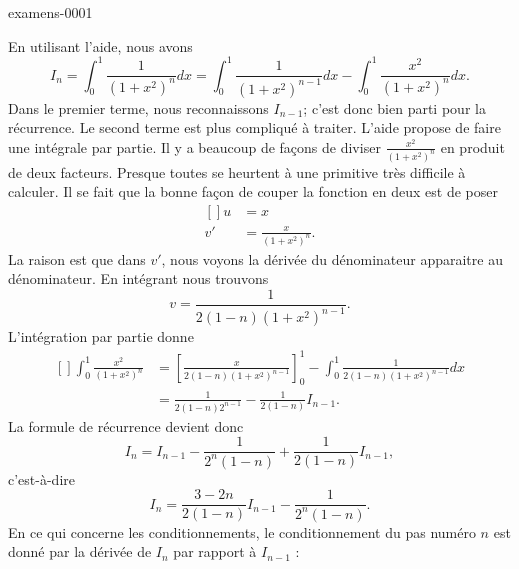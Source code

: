 
\begin{corrige}{examens-0001}

	En utilisant l'aide, nous avons
	\begin{equation}
		I_n=\int_0^1\frac{1}{ (1+x^2)^n }dx=\int_0^1\frac{1}{ (1+x^2)^{n-1} }dx-\int_0^1\frac{ x^2 }{ (1+x^2)^n }dx.
	\end{equation}
	Dans le premier terme, nous reconnaissons $I_{n-1}$; c'est donc bien parti pour la récurrence. Le second terme est plus compliqué à traiter. L'aide propose de faire une intégrale par partie. Il y a beaucoup de façons de diviser $\frac{ x^2 }{ (1+x^2)^n }$ en produit de deux facteurs. Presque toutes se heurtent à une primitive très difficile à calculer. Il se fait que la bonne façon de couper la fonction en deux est de poser
	\begin{equation}
		\begin{aligned}[]
			u&=x\\
			v'&=\frac{ x }{ (1+x^2)^n }.
		\end{aligned}
	\end{equation}
	La raison est que dans $v'$, nous voyons la dérivée du dénominateur apparaitre au dénominateur. En intégrant nous trouvons
	\begin{equation}
		v=\frac{1}{ 2(1-n)(1+x^2)^{n-1} }.
	\end{equation}
	L'intégration par partie donne
	\begin{equation}
		\begin{aligned}[]
			\int_0^1\frac{ x^2 }{ (1+x^2)^n }&=\left[ \frac{ x }{ 2(1-n)(1+x^2)^{n-1} } \right]_0^1-\int_0^1\frac{1}{ 2(1-n)(1+x^2)^{n-1} }dx\\
			&=\frac{1}{ 2(1-n)2^{n-1} }-\frac{1}{ 2(1-n) }I_{n-1}.
		\end{aligned}
	\end{equation}
	La formule de récurrence devient donc
	\begin{equation}
		I_n=I_{n-1}-\frac{1}{ 2^n(1-n) }+\frac{1}{ 2(1-n) }I_{n-1},
	\end{equation}
	c'est-à-dire
	\begin{equation}
		I_n=\frac{ 3-2n }{ 2(1-n) }I_{n-1}-\frac{1}{ 2^n(1-n) }.
	\end{equation}
	En ce qui concerne les conditionnements, le conditionnement du pas numéro $n$ est donné par la dérivée de $I_n$ par rapport à $I_{n-1}$ :

\end{corrige}

